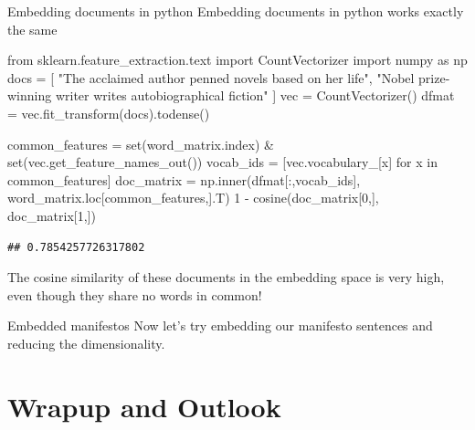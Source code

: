 \documentclass[
  10pt,
  ignorenonframetext,
  aspectratio=169]{beamer}
\newenvironment{Shaded}{\begin{snugshade}}{\end{snugshade}}
\newcommand{\BuiltInTok}[1]{\textcolor[rgb]{0.80,0.80,0.80}{#1}}
\newcommand{\ControlFlowTok}[1]{\textcolor[rgb]{0.94,0.87,0.69}{#1}}
\newcommand{\DecValTok}[1]{\textcolor[rgb]{0.86,0.86,0.80}{#1}}
\newcommand{\ImportTok}[1]{\textcolor[rgb]{0.80,0.80,0.80}{#1}}
\newcommand{\KeywordTok}[1]{\textcolor[rgb]{0.94,0.87,0.69}{#1}}
\newcommand{\NormalTok}[1]{\textcolor[rgb]{0.80,0.80,0.80}{#1}}
\newcommand{\OperatorTok}[1]{\textcolor[rgb]{0.94,0.94,0.82}{#1}}
\newcommand{\StringTok}[1]{\textcolor[rgb]{0.80,0.58,0.58}{#1}}
\begin{document}
\begin{frame}[fragile]{Embedding documents in python}
\protect\hypertarget{embedding-documents-in-python}{}
Embedding documents in python works exactly the same

\medskip

\scriptsize

\begin{Shaded}
\begin{Highlighting}[]
\ImportTok{from}\NormalTok{ sklearn.feature\_extraction.text }\ImportTok{import}\NormalTok{ CountVectorizer}
\ImportTok{import}\NormalTok{ numpy }\ImportTok{as}\NormalTok{ np}
\NormalTok{docs }\OperatorTok{=}\NormalTok{ [}
  \StringTok{"The acclaimed author penned novels based on her life"}\NormalTok{,}
  \StringTok{"Nobel prize{-}winning writer writes autobiographical fiction"}
\NormalTok{]}
\NormalTok{vec }\OperatorTok{=}\NormalTok{ CountVectorizer()}
\NormalTok{dfmat }\OperatorTok{=}\NormalTok{ vec.fit\_transform(docs).todense()}

\NormalTok{common\_features }\OperatorTok{=} \BuiltInTok{set}\NormalTok{(word\_matrix.index) }\OperatorTok{\&} \BuiltInTok{set}\NormalTok{(vec.get\_feature\_names\_out())}
\NormalTok{vocab\_ids }\OperatorTok{=}\NormalTok{ [vec.vocabulary\_[x] }\ControlFlowTok{for}\NormalTok{ x }\KeywordTok{in}\NormalTok{ common\_features]}
\NormalTok{doc\_matrix }\OperatorTok{=}\NormalTok{ np.inner(dfmat[:,vocab\_ids], word\_matrix.loc[common\_features,].T)}
\DecValTok{1} \OperatorTok{{-}}\NormalTok{ cosine(doc\_matrix[}\DecValTok{0}\NormalTok{,], doc\_matrix[}\DecValTok{1}\NormalTok{,])}
\end{Highlighting}
\end{Shaded}

\begin{verbatim}
## 0.7854257726317802
\end{verbatim}

\medskip

\normalsize

The cosine similarity of these documents in the embedding space is very
high, even though they share no words in common!
\end{frame}

\begin{frame}{Embedded manifestos}
\protect\hypertarget{embedded-manifestos}{}
Now let's try embedding our manifesto sentences and reducing the
dimensionality.
\end{frame}

\hypertarget{wrapup-and-outlook}{%
\section{Wrapup and Outlook}\label{wrapup-and-outlook}}
\end{document}
